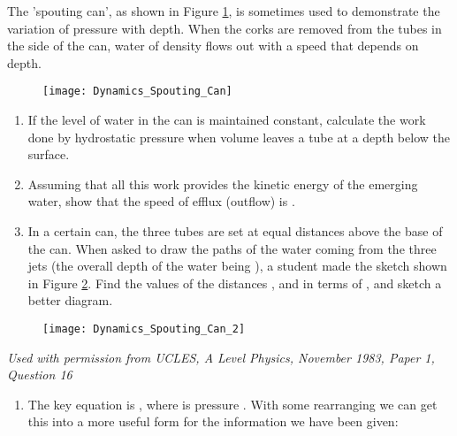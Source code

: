 
\begin{problem} 
{The 'spouting can', as shown in Figure \ref{fig:Dynamics_Spouting_Can}, is sometimes used to demonstrate the variation of pressure with depth. When the corks are removed from the tubes in the side of the can, water of density \vari{\rho} flows out with a speed that depends on depth.

\begin{figure}[h]
	\centering
	\texttt{[image: Dynamics\_Spouting\_Can]}
	\caption{}\label{fig:Dynamics_Spouting_Can}
\end{figure}

\begin{enumerate} 
\item If the level of water in the can is maintained constant, calculate the work done by hydrostatic pressure when volume  leaves a tube at a depth  below the surface. 

\item Assuming that all this work provides the kinetic energy of the emerging water, show that the speed  of efflux (outflow) is .

\item In a certain can, the three tubes are set at equal distances  above the base of the can. When asked to draw the paths of the water coming from the three jets (the overall depth of the water being ), a student made the sketch shown  in Figure \ref{fig:Dynamics_Spouting_Can_2}. Find the values of the distances ,  and  in terms of , and sketch a better diagram. \end{enumerate}

\begin{figure}[h]
	\centering
	\texttt{[image: Dynamics\_Spouting\_Can\_2]}
	\caption{}\label{fig:Dynamics_Spouting_Can_2}
\end{figure}
}{
\textit{Used with permission from UCLES, A Level Physics, November 1983, Paper 1, Question 16}
}{\begin{enumerate}
\item The key equation is \value{P}{h\rho g}{}, where  is pressure . With some rearranging we can get this into a more useful form for the information we have been given:


\end{enumerate}}
\end{problem}
